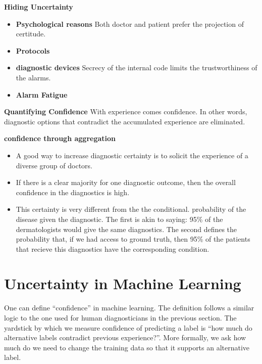 \documentclass[9pt,twocolumn,twoside]{pnas-new}
\begin{document}
 {\bf Hiding Uncertainty}
  \begin{itemize}
    \item {\bf Psychological reasons} Both doctor and patient prefer
      the projection of certitude.
    \item {\bf Protocols}
    \item {\bf diagnostic devices} Secrecy of the internal code limits
      the trustworthiness of the alarms.
    \item{\bf Alarm Fatigue}
  \end{itemize}

  {\bf Quantifying Confidence} With experience comes confidence. In
  other words, diagnostic options that contradict the accumulated
  experience are eliminated.
  
  {\bf confidence through aggregation}
  \begin{itemize}
    \item A good way to increase diagnostic certainty is to solicit
      the experience of a diverse group of doctors.
    \item If there is a clear majority for one diagnostic outcome,
      then the overall confidence in the diagnostics is high.
    \item This certainty is very different from the the conditional.
      probability of the disease given the diagnostic. The first is
      akin to saying: 95\% of the dermatologists would give the same
      diagnostics. The second defines the probability that, if we had
      access to ground truth, then 95\% of the patients that recieve
      this diagnostics have the corresponding condition.
    \end{itemize}
    
\section*{Uncertainty in Machine Learning}

One can define ``confidence'' in machine learning. The definition follows a
similar logic to the one used for human diagnosticians in the previous
section. The yardstick by which we measure confidence of predicting a
label is ``how much do alternative labels contradict previous
experience?''.
More formally, we ask how much do we need to change the training data
so that it supports an alternative label.



\end{document}
